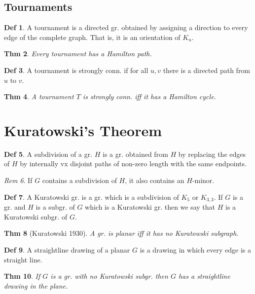 \documentclass[11pt, fleqn, a4paper, landscape]{article}
\theoremstyle{plain} %
\newtheorem{thm}{Thm}
\theoremstyle{remark} %
\newtheorem{rem}[thm]{Rem}
\theoremstyle{definition} %
\newtheorem{defi}[thm]{Def}
\begin{document}
\begin{multicols}{5}
\subsection{Tournaments}
\begin{defi}
A tournament is a directed gr. obtained by assigning a direction to every
edge of the complete graph. That is, it is an orientation of $K_n$.
\end{defi}

\begin{thm}
Every tournament has a Hamilton path.
\end{thm}

\begin{defi}
A tournament is strongly conn. if for all $u, v$ there is a directed path from $u$ to $v$.
\end{defi}
\begin{thm}
A tournament $T$ is strongly conn. iff it has a Hamilton cycle.
\end{thm}

\section{Kuratowski’s Theorem}

\begin{defi}
A subdivision of a gr. $H$ is a gr. obtained from $H$ by replacing the edges of $H$ by internally vx disjoint paths of non-zero length with the same endpoints.
\end{defi}
\addtocounter{thm}{1}
\begin{rem}
If $G$ contains a subdivision of $H$, it also contains an $H$-minor.
\end{rem}

\begin{defi}
A Kuratowski gr. is a gr. which is a subdivision of $K_5$ or $K_{3,3}$. If $G$ is a gr. and $H$ is a subgr. of $G$ which is a Kuratowski gr. then we say that $H$ is a Kuratowski subgr. of $G$.
\end{defi}

\begin{thm}[Kuratowski 1930]
A gr. is planar iff it has no Kuratowski subgraph.
\end{thm}

\begin{defi}
A straightline drawing of a planar $G$ is a drawing in which every edge is a straight line.
\end{defi}

\begin{thm}
If $G$ is a gr. with no Kuratowski subgr. then $G$ has a straightline drawing in the plane.
\end{thm}


\end{multicols}
\end{document}
